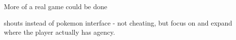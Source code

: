 
More of a real game could be done

shouts instead of pokemon interface - not cheating, but focus on and expand where the player actually has agency.